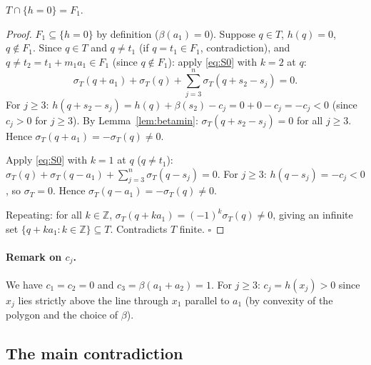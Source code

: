 \begin{lemma}[hzero]\label{lem:hzero}
$T \cap \{h = 0\} = F_1$.
\end{lemma}
\begin{proof}
$F_1 \subseteq \{h=0\}$ by definition ($\beta(a_1)=0$).
Suppose $q \in T$, $h(q)=0$, $q \notin F_1$.
Since $q \in T$ and $q \neq t_1$ (if $q=t_1 \in F_1$, contradiction), and
$q \neq t_2 = t_1 + m_1 a_1 \in F_1$ (since $q \notin F_1$):
apply \eqref{eq:S0} with $k=2$ at $q$:
\[
  \sigma_T(q + a_1) + \sigma_T(q) + \sum_{j=3}^n \sigma_T(q + s_2 - s_j) = 0.
\]
For $j \geq 3$: $h(q + s_2 - s_j) = h(q) + \beta(s_2) - c_j = 0 + 0 - c_j = -c_j < 0$
(since $c_j > 0$ for $j \geq 3$).
By Lemma~\ref{lem:betamin}: $\sigma_T(q + s_2 - s_j) = 0$ for all $j \geq 3$.
Hence $\sigma_T(q + a_1) = -\sigma_T(q) \neq 0$.

Apply \eqref{eq:S0} with $k=1$ at $q$ ($q \neq t_1$):
$\sigma_T(q) + \sigma_T(q - a_1) + \sum_{j=3}^n \sigma_T(q - s_j) = 0$.
For $j \geq 3$: $h(q - s_j) = -c_j < 0$, so $\sigma_T = 0$.
Hence $\sigma_T(q - a_1) = -\sigma_T(q) \neq 0$.

Repeating: for all $k \in \mathbb{Z}$, $\sigma_T(q + k a_1) = (-1)^k \sigma_T(q) \neq 0$,
giving an infinite set $\{q + k a_1 : k \in \mathbb{Z}\} \subseteq T$.
Contradicts $T$ finite. $\square$
\end{proof}

\paragraph{Remark on $c_j$.}
We have $c_1 = c_2 = 0$ and $c_3 = \beta(a_1 + a_2) = 1$.  For $j \geq 3$:
$c_j = h(x_j) > 0$ since $x_j$ lies strictly above the line through $x_1$ parallel
to $a_1$ (by convexity of the polygon and the choice of $\beta$).

\bigskip

\subsection*{The main contradiction}

